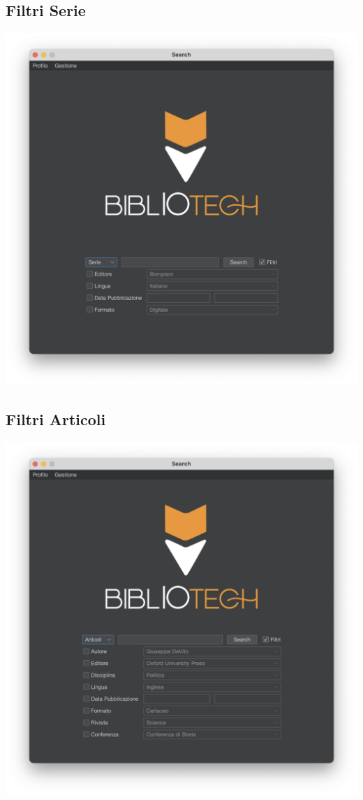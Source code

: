 \subsection{Filtri Serie}
\includegraphics[scale=0.45]{Immagini/Schermate/Search/SearchPage-FiltriSerie.png}
\subsection{Filtri Articoli}
\includegraphics[scale=0.45]{Immagini/Schermate/Search/SearchPage-FiltriArticoli.png}
